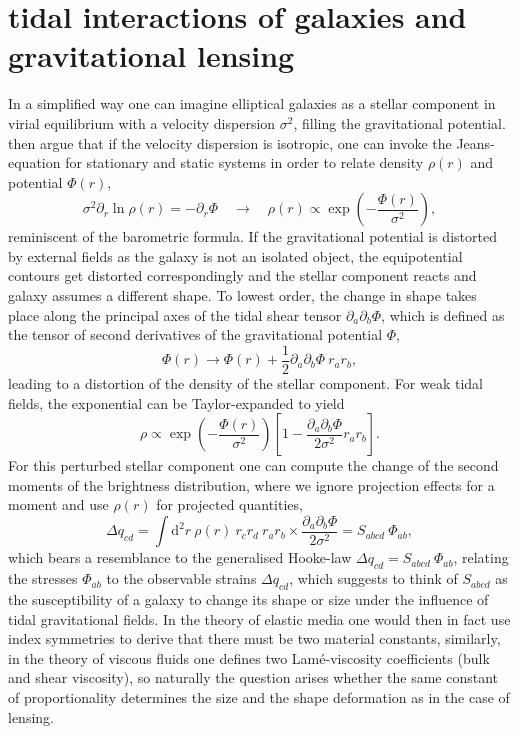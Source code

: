 \documentclass[a4paper,fleqn,usenatbib]{mnras}
\newcommand{\dd}{\mathrm{d}}
\begin{document}
\section{tidal interactions of galaxies and gravitational lensing}\label{sect_tidal}
In a simplified way one can imagine elliptical galaxies as a stellar component in virial equilibrium with a velocity dispersion $\sigma^2$, filling the gravitational potential. \citet{piras_mass_2018} then argue that if the velocity dispersion is isotropic, one can invoke the Jeans-equation for stationary and static systems in order to relate density $\rho(r)$ and potential $\Phi(r)$,
\begin{equation}
\sigma^2\partial_r\ln\rho(r) = -\partial_r\Phi
\quad\rightarrow\quad
\rho(r) \propto \exp\left(-\frac{\Phi(r)}{\sigma^2}\right),
\end{equation}
reminiscent of the barometric formula. If the gravitational potential is distorted by external fields as the galaxy is not an isolated object, the equipotential contours get distorted correspondingly and the stellar component reacts and galaxy assumes a different shape. To lowest order, the change in shape takes place along the principal axes of the tidal shear tensor $\partial_a\partial_b\Phi$, which is defined as the tensor of second derivatives of the gravitational potential $\Phi$,
\begin{equation}
\Phi(r) \rightarrow \Phi(r) + \frac{1}{2}\partial_a\partial_b\Phi\:r_a r_b,
\end{equation}
leading to a distortion of the density of the stellar component. For weak tidal fields, the exponential can be Taylor-expanded to yield
\begin{equation}
\rho \propto 
\exp\left(-\frac{\Phi(r)}{\sigma^2}\right)\left[1-\frac{\partial_a\partial_b\Phi}{2\sigma^2}r_a r_b\right].
\end{equation}
For this perturbed stellar component one can compute the change of the second moments of the brightness distribution, where we ignore projection effects for a moment and use $\rho(r)$ for projected quantities,
\begin{equation}
\Delta q_{cd} = 
\int\dd^2r\:\rho(r)\: r_c r_d\: r_a r_b\times\frac{\partial_a\partial_b\Phi}{2\sigma^2} = S_{abcd}\:\Phi_{ab},
\end{equation}
which bears a resemblance to the generalised Hooke-law $\Delta q_{cd} = S_{abcd}\:\Phi_{ab}$, relating the stresses $\Phi_{ab}$ to the observable strains $\Delta q_{cd}$, which suggests to think of $S_{abcd}$ as the susceptibility of a galaxy to change its shape or size under the influence of tidal gravitational fields. In the theory of elastic media one would then in fact use index symmetries to derive that there must be two material constants, similarly, in the theory of viscous fluids one defines two Lam{\'e}-viscosity coefficients (bulk and shear viscosity), so naturally the question arises whether the same constant of proportionality determines the size and the shape deformation as in the case of lensing.
\end{document}
